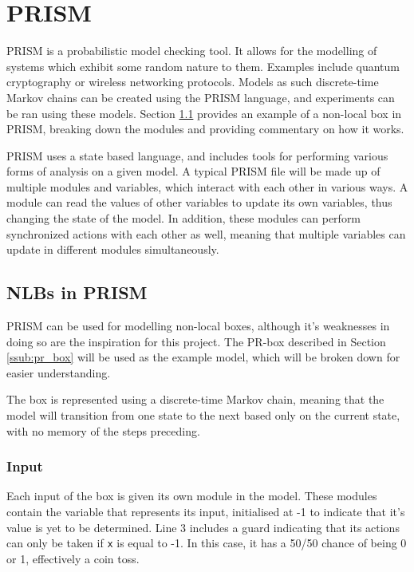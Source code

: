 \documentclass[report.tex]{subfiles}
\begin{document}

\section{PRISM} %
\label{sec:prism}
PRISM \cite{KNP11} is a probabilistic model checking tool. It allows for
the modelling of systems which exhibit some random nature to them. Examples
include quantum cryptography or wireless networking protocols. Models as such
discrete-time Markov chains can be created using the PRISM language, and
experiments can be ran using these models. Section \ref{sub:nlbs_in_prism}
provides an example of a non-local box in PRISM, breaking down the modules and
providing commentary on how it works.

PRISM uses a state based language, and includes tools for performing various
forms of analysis on a given model. A typical PRISM file will be made up of
multiple modules and variables, which interact with each other in various ways.
A module can read the values of other variables to update its own variables,
thus changing the state of the model. In addition, these modules can perform
synchronized actions with each other as well, meaning that multiple variables
can update in different modules simultaneously.

\subsection{NLBs in PRISM} %
\label{sub:nlbs_in_prism}
PRISM can be used for modelling non-local boxes, although it's weaknesses in 
doing so are the inspiration for this project. The PR-box described in
Section \ref{ssub:pr_box} will be used as the example model, which will be
broken down for easier understanding.

The box is represented using a discrete-time Markov chain, meaning that the 
model will transition from one state to the next based only on the current
state, with no memory of the steps preceding.

\subsubsection{Input} %
\label{ssub:input}
 

Each input of the box is given its own module in the model. These modules
contain the variable that represents its input, initialised at -1 to indicate
that it's value is yet to be determined. Line 3 includes a guard indicating that
its actions can only be taken if \texttt{x} is equal to -1. In this case, it has
a 50/50 chance of being 0 or 1, effectively a coin toss.
\end{document}
